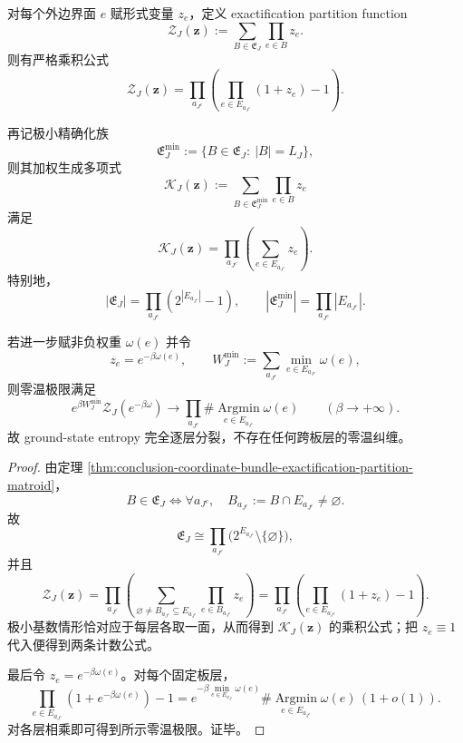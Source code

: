 \begin{theorem}[精确化配分函数的完全乘积化与零温层熵]\label{thm:conclusion-coordinate-bundle-kirchhoff-complete-factorization}
对每个外边界面 \(e\) 赋形式变量 \(z_e\)，定义 exactification partition function
\[
\mathcal Z_J(\mathbf z)
:=
\sum_{B\in \mathfrak E_J}\prod_{e\in B}z_e.
\]
则有严格乘积公式
\[
\mathcal Z_J(\mathbf z)
=
\prod_{a_{J^c}}
\left(
\prod_{e\in E_{a_{J^c}}}(1+z_e)-1
\right).
\]

再记极小精确化族
\[
\mathfrak E_J^{\min}
:=
\{B\in \mathfrak E_J:\ |B|=L_J\},
\]
则其加权生成多项式
\[
\mathcal K_J(\mathbf z)
:=
\sum_{B\in \mathfrak E_J^{\min}}
\prod_{e\in B}z_e
\]
满足
\[
\mathcal K_J(\mathbf z)
=
\prod_{a_{J^c}}
\left(
\sum_{e\in E_{a_{J^c}}}z_e
\right).
\]
特别地，
\[
|\mathfrak E_J|
=
\prod_{a_{J^c}}(2^{|E_{a_{J^c}}|}-1),
\qquad
|\mathfrak E_J^{\min}|
=
\prod_{a_{J^c}}|E_{a_{J^c}}|.
\]

若进一步赋非负权重 \(\omega(e)\) 并令
\[
z_e=e^{-\beta\omega(e)},
\qquad
W_J^{\min}
:=
\sum_{a_{J^c}}\min_{e\in E_{a_{J^c}}}\omega(e),
\]
则零温极限满足
\[
e^{\beta W_J^{\min}}\mathcal Z_J(e^{-\beta\omega})
\longrightarrow
\prod_{a_{J^c}}
\#\operatorname*{Argmin}_{e\in E_{a_{J^c}}}\omega(e)
\qquad
(\beta\to+\infty).
\]
故 ground-state entropy 完全逐层分裂，不存在任何跨板层的零温纠缠。
\end{theorem}
\begin{proof}
由定理 \ref{thm:conclusion-coordinate-bundle-exactification-partition-matroid}，
\[
B\in \mathfrak E_J
\iff
\forall a_{J^c},\quad
B_{a_{J^c}}:=B\cap E_{a_{J^c}}\neq \varnothing.
\]
故
\[
\mathfrak E_J
\cong
\prod_{a_{J^c}}
\bigl(2^{E_{a_{J^c}}}\setminus\{\varnothing\}\bigr),
\]
并且
\[
\mathcal Z_J(\mathbf z)
=
\prod_{a_{J^c}}
\left(
\sum_{\varnothing\neq B_{a_{J^c}}\subseteq E_{a_{J^c}}}
\prod_{e\in B_{a_{J^c}}}z_e
\right)
=
\prod_{a_{J^c}}
\left(
\prod_{e\in E_{a_{J^c}}}(1+z_e)-1
\right).
\]
极小基数情形恰对应于每层各取一面，从而得到 \(\mathcal K_J(\mathbf z)\) 的乘积公式；把 \(z_e\equiv 1\) 代入便得到两条计数公式。

最后令 \(z_e=e^{-\beta\omega(e)}\)。对每个固定板层，
\[
\prod_{e\in E_{a_{J^c}}}(1+e^{-\beta\omega(e)})-1
=
e^{-\beta \min_{e\in E_{a_{J^c}}}\omega(e)}
\#\operatorname*{Argmin}_{e\in E_{a_{J^c}}}\omega(e)\,(1+o(1)).
\]
对各层相乘即可得到所示零温极限。证毕。
\end{proof}

